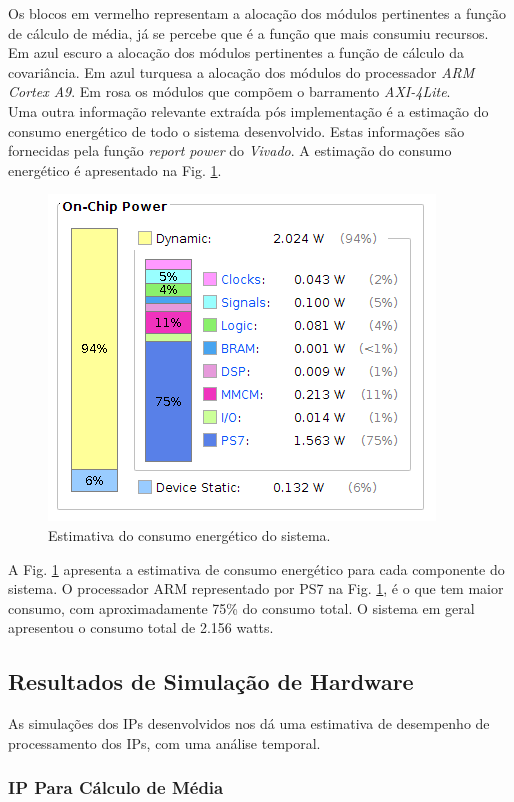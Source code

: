 Os blocos em vermelho representam a alocação dos módulos pertinentes a função de cálculo de média, já se percebe que é a função que mais consumiu recursos. Em azul escuro a alocação dos módulos pertinentes a função de cálculo da covariância. Em azul turquesa a alocação dos módulos do processador \textit{ARM Cortex A9}. 
Em rosa os módulos que compõem o barramento \textit{AXI-4Lite}.\\
Uma outra informação relevante extraída pós implementação é a estimação do consumo energético de todo o sistema desenvolvido. Estas informações são fornecidas pela função \textit{report power} do \textit{Vivado}. A estimação do consumo energético é apresentado na Fig. \ref{power}.
\begin{figure}[!h]
	\centering
	\includegraphics[keepaspectratio=true,scale=0.5]{figuras/power.png}
	\caption{Estimativa do consumo energético do sistema.}
	\label{power}
\end{figure}

A Fig. \ref{power} apresenta a estimativa de consumo energético para cada componente do sistema. O processador ARM representado por PS7 na Fig. \ref{power}, é o que tem maior consumo, com aproximadamente 75\% do consumo total. O sistema em geral apresentou o consumo total de 2.156 watts.

\newpage
 

\subsection{Resultados de Simulação de Hardware}
As simulações dos IPs desenvolvidos nos dá uma estimativa de desempenho de processamento dos IPs, com uma análise temporal. 

\subsubsection{IP Para Cálculo de Média}

